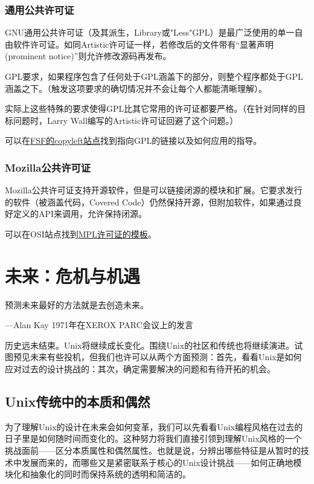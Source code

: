 \documentclass[12pt,oneside]{book}
\begin{document}
\subsection{通用公共许可证}
GNU通用公共许可证（及其派生，Library或"Less"GPL）是最广泛使用的单一自由软件许可证。如同Artistic许可证一样，若修改后的文件带有“显著声明(prominent notice)”则允许修改源码再发布。

GPL要求，如果程序包含了任何处于GPL涵盖下的部分，则整个程序都处于GPL涵盖之下。（触发这项要求的确切情况并不会让每个人都能清晰理解）。

实际上这些特殊的要求使得GPL比其它常用的许可证都要严格。（在针对同样的目标问题时，Larry Wall编写的Artistic许可证回避了这个问题。）

可以在\href{http://www.gnu.org/copyleft.html}{FSF的copyleft站点}找到指向GPL的链接以及如何应用的指导。

\subsection{Mozilla公共许可证}
Mozilla公共许可证支持开源软件，但是可以链接闭源的模块和扩展。它要求发行的软件（被涵盖代码，Covered Code）仍然保持开源，但附加软件，如果通过良好定义的API来调用，允许保持闭源。

可以在OSI站点找到\href{http://www.opensource.org/licenses/MPL-1.1.html}{MPL许可证的模板}。


\chapter{未来：危机与机遇}
\begin{flushright}
预测未来最好的方法就是去创造未来。

{\hfill —Alan Kay 1971年在XEROX PARC会议上的发言}
\end{flushright}

历史远未结束。Unix将继续成长变化。围绕Unix的社区和传统也将继续演进。试图预见未来有些投机，但我们也许可以从两个方面预测：首先，看看Unix是如何应对过去的设计挑战的：其次，确定需要解决的问题和有待开拓的机会。

\section{Unix传统中的本质和偶然}
为了理解Unix的设计在未来会如何变革，我们可以先看看Unix编程风格在过去的日子里是如何随时间而变化的。这种努力将我们直接引领到理解Unix风格的一个挑战面前——区分本质属性和偶然属性。也就是说，分辨出哪些特征是从暂时的技术中发展而来的，而哪些又是紧密联系于核心的Unix设计挑战——如何正确地模块化和抽象化的同时而保持系统的透明和简洁的。
\end{document}
